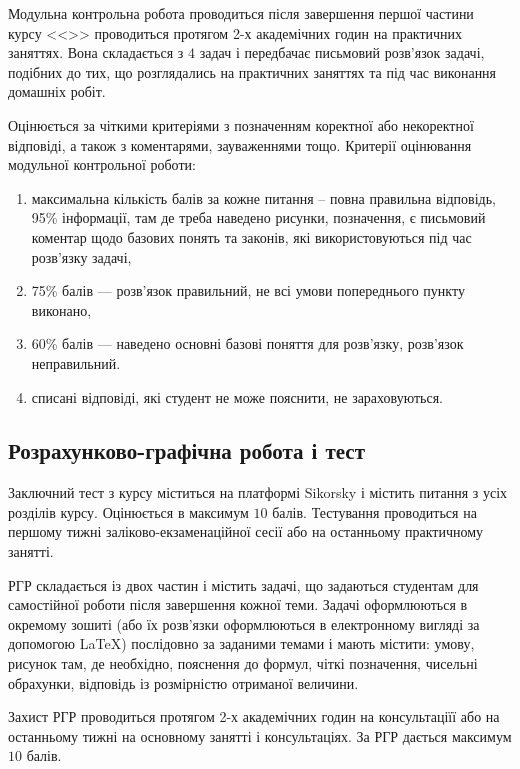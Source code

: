 \documentclass{Syllabus}
\begin{document}

Модульна контрольна робота проводиться після завершення першої частини курсу <<\discipline>> проводиться протягом 2-х академічних годин на практичних заняттях. Вона складається з $4$ задач і передбачає письмовий розв’язок задачі, подібних до тих, що розглядались на практичних заняттях та під час виконання домашніх робіт.

Оцінюється за чіткими критеріями з позначенням коректної або некоректної відповіді, а також з коментарями, зауваженнями тощо. Критерії оцінювання модульної контрольної роботи:
\begin{enumerate}[label=$\bullet$]
    \item максимальна кількість балів за кожне питання – повна правильна відповідь, 95\% інформації, там де треба наведено рисунки, позначення, є письмовий коментар щодо базових понять та законів, які використовуються під час розв’язку задачі,
    \item 75\% балів --- розв’язок правильний, не всі умови попереднього пункту виконано,
    \item 60\% балів --- наведено основні базові поняття для розв’язку, розв’язок неправильний.
    \item списані відповіді, які студент не може пояснити, не зараховуються.
\end{enumerate}


\subsection*{Розрахунково-графічна робота і тест}

Заключний тест з курсу міститься на платформі Sikorsky і містить питання з усіх розділів курсу. Оцінюється в максимум  $10$ балів. Тестування проводиться на першому тижні заліково-екзаменаційної сесії або на останньому практичному занятті.

РГР складається із двох частин і містить задачі, що задаються студентам для самостійної роботи після завершення кожної теми. Задачі оформлюються в окремому зошиті (або їх розв'язки оформлюються в електронному вигляді за допомогою \LaTeX{}) послідовно за заданими темами і мають містити: умову, рисунок там, де необхідно, пояснення до формул, чіткі позначення, чисельні обрахунки, відповідь із розмірністю отриманої величини.

Захист РГР проводиться протягом 2-х академічних годин на консультаціїї або на останньому тижні на основному занятті і консультаціях. За РГР дається максимум $10$ балів.
\end{document}
